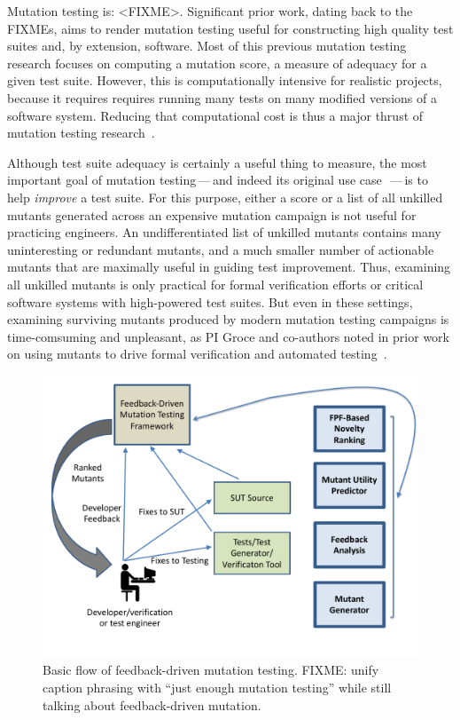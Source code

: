 Mutation testing is: <FIXME>.  Significant prior work, dating back to the
FIXMEs, aims to render mutation testing useful for constructing high quality
test suites and, by extension, software.  Most of this previous mutation testing
research focuses on computing a mutation score, a measure of adequacy for a
given test suite.  However, this is computationally intensive for realistic
projects, because it requires requires running many tests on many modified
versions of a software system.  Reducing that computational cost is thus a major
thrust of mutation testing research~\cite{jia2011analysis}.   

Although test suite adequacy is certainly a useful thing to measure, the most
important goal of mutation testing\,---\,and indeed its original use
case~\cite{something}\,---\,is to help \emph{improve} a test suite.  For this
purpose, either a score or a list of all unkilled mutants generated across an
expensive mutation campaign is not useful for practicing engineers.  An
undifferentiated list of unkilled mutants contains many uninteresting or
redundant mutants, and a much smaller number of actionable mutants that are
maximally useful in guiding test improvement.  Thus, examining all unkilled
mutants is only practical for formal verification efforts or critical software
systems with high-powered test suites.  But even in these settings, examining
surviving mutants produced by modern mutation testing campaigns is
time-comsuming and unpleasant, as PI Groce and co-authors noted in prior work on
using mutants to drive formal verification and automated
testing~\cite{groce2015verified,groce2018verified,mutKernel}.


\begin{figure}[t]
\centering
\includegraphics[width=0.8\columnwidth]{TestFlow}

\caption{Basic flow of feedback-driven mutation testing. FIXME: unify caption
  phrasing with ``just enough mutation testing'' while still talking about
  feedback-driven mutation.}
\label{fig:flow}
\end{figure}


